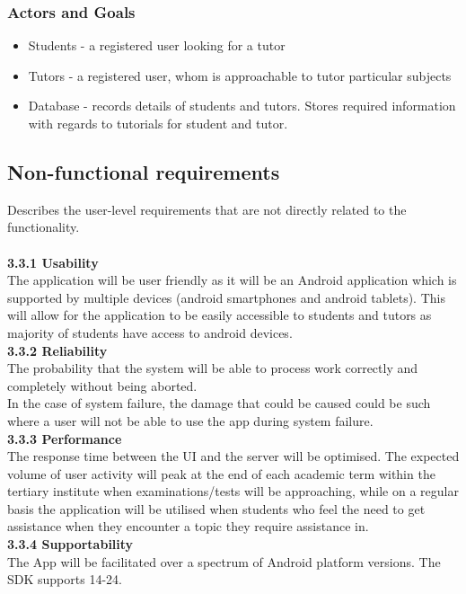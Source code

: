 \documentclass[12pt]{article}
\begin{document}
\subsubsection{Actors and Goals}
\begin{itemize}
\item Students - a registered user looking for a tutor
\item Tutors - a registered user, whom is approachable to tutor particular subjects
\item Database - records details of students and tutors. Stores required information with regards to tutorials for student and tutor.
\end{itemize}

\subsection{Non-functional requirements}{
Describes the user-level requirements that are not directly related to the functionality. \\
\\\textbf{3.3.1 Usability}\\
The application will be user friendly as it will be an Android application which is supported by multiple devices (android smartphones and android tablets). This will allow for the application to be easily accessible to students and tutors as majority of students have access to android devices.
\\\textbf{3.3.2 Reliability}\\
The probability that the system will be able to process work correctly and completely without being aborted.\\
In the case of system failure, the damage that could be caused could be such where a user will not be able to use the app during system failure.
\\\textbf{3.3.3 Performance}\\
The response time between the UI and the server will be optimised. The expected volume of user activity will peak at the end of each academic term within the tertiary institute when examinations/tests will be approaching, while on a regular basis the application will be utilised when students who feel the need to get assistance when they encounter a topic they require assistance in.
\\\textbf{3.3.4 Supportability}\\
The App will be facilitated over a spectrum of Android platform versions. The SDK supports 14-24. \\
}
\end{document}
